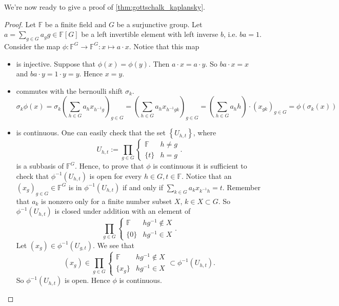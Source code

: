 \documentclass[titlepage, a4paper]{article}
\newcommand{\F}{\mathbb{F}}
\theoremstyle{remark}
\begin{document}
	We're now ready to give a proof of \cref{thm:gottschalk_kaplansky}.
	\begin{proof}
		Let $\F$ be a finite field and $G$ be a surjunctive group. 
		Let $a = \sum_{g \in G} a_g g \in \F[G]$ be a left invertible element with left inverse $b$, i.e.  $b a = 1$. 
		Consider the map $\phi: \F^{G} \to \F^{G}: x \mapsto a\cdot x$. Notice that this map 
		\begin{itemize}
			\item is injective. Suppose that $\phi(x) = \phi(y)$. Then $a\cdot x = a\cdot y$. So $ba\cdot x  = x$ and $ba \cdot y = 1\cdot y = y$. Hence $x = y$.
			\item commutes with the bernoulli shift  $\sigma_k$. 
				 \[
					 \sigma_k \phi(x) 
					 = \sigma_k\left( \sum_{h \in G} a_h x_{h^{-1}g} \right)_{g \in G} 
					 = \left( \sum_{h \in G} a_h x_{h^{-1}gk} \right)_{g \in G} 
					 = \left( \sum_{h \in G}a_h h \right) \cdot (x_{gk})_{g \in G} = \phi(\sigma_k(x)) 
				\]
			\item is continuous. 
			One can easily check that the set $\left\{ U_{h, t} \right\}$, where \[
			U_{h,t}:= \prod_{g \in G} \begin{cases}
				\F & h \ne g\\
				\{t\}& h = g
			\end{cases}
			.\] 
			is a subbasis of $\F^{G}$. 
			Hence, to prove that $\phi$ is continuous it is sufficient to check that $\phi^{-1}(U_{h, t})$ is open for every $h \in G, t\in \F$.
			Notice that an  $(x_g)_{g \in G} \in \F^{G}$ is in $\phi^{-1}(U_{h,t})$ if and only if $\sum_{k \in G} a_k x_{k^{-1}h} = t$. 
			Remember that $a_k$ is nonzero only for a finite number subset $X$,  $k\in X \subset G$. 	
			So $\phi^{-1}(U_{h, t})$ is closed under addition with an element of  \[
			\prod_{g \in G} \begin{cases}
				\F & hg^{-1}  \not\in X\\
				\{0\} & hg^{-1} \in X 
			\end{cases}
			.\] 
			Let  $(x_g) \in \phi^{-1}(U_{g,t})$. We see that  \[
				(x_g) \in \prod_{g \in G} \begin{cases}
					\F & hg^{-1} \not\in X\\
					\{x_g\} & hg^{-1} \in X
				\end{cases}
				\subset \phi^{-1}(U_{h, t})
			.\] 
			So $\phi^{-1}(U_{h,t})$ is open. Hence $\phi$ is continuous.


\end{itemize}
\end{proof}
\end{document}
